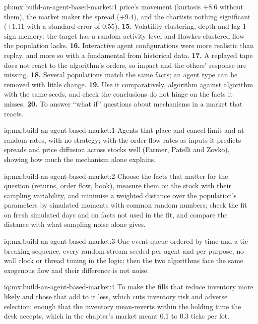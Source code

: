 \begin{solution}{pb:mx:build-an-agent-based-market:1}
price's movement (kurtosis $+8.6$ without them), the market maker the spread ($+9.4$), and the chartists nothing significant ($+1.11$ with a standard error of 0.55).
\textbf{15.} Volatility clustering, depth and lag-1 sign memory: the target has a random activity level and Hawkes-clustered flow the population lacks.
\textbf{16.} Interactive agent configurations were more realistic than replay, and more so with a fundamental from historical data.
\textbf{17.} A replayed tape does not react to the algorithm's orders, so impact and the others' response are missing.
\textbf{18.} Several populations match the same facts; an agent type can be removed with little change.
\textbf{19.} Use it comparatively, algorithm against algorithm with the same seeds, and check the conclusions do not hinge on the facts it misses.
\textbf{20.} To answer ``what if'' questions about mechanisms in a market that reacts.
\end{solution}

\begin{solution}{iq:mx:build-an-agent-based-market:1}
Agents that place and cancel limit and  at random rates, with no strategy; with the order-flow rates as inputs it predicts spreads and
price diffusion across stocks well (Farmer, Patelli and Zovko), showing how much the mechanism alone explains.
\end{solution}

\begin{solution}{iq:mx:build-an-agent-based-market:2}
Choose the facts that matter for the question (returns, order flow, book), measure them on the stock with their sampling variability, and minimise a
weighted distance over the population's parameters by simulated moments with common random numbers; check the fit on fresh simulated days and on
facts not used in the fit, and compare the distance with what sampling noise alone gives.
\end{solution}

\begin{solution}{iq:mx:build-an-agent-based-market:3}
One event queue ordered by time and a tie-breaking sequence, every random stream seeded per agent and per purpose, no wall clock or thread timing in
the logic; then the two algorithms face the same exogenous flow and their difference is not noise.
\end{solution}

\begin{solution}{iq:mx:build-an-agent-based-market:4}
To make the fills that reduce inventory more likely and those that add to it less, which cuts inventory risk and adverse selection; enough that the
inventory mean-reverts within the holding time the desk accepts, which in the chapter's market meant 0.1 to 0.3 ticks per lot.
\end{solution}

